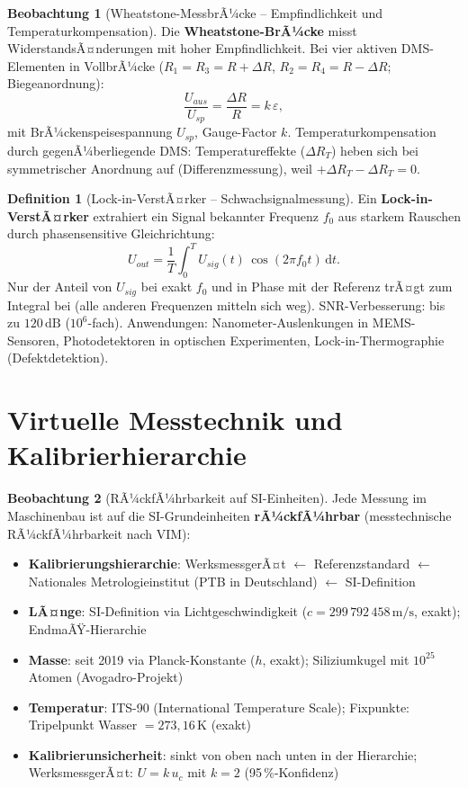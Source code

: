 ﻿\documentclass[a4paper,12pt]{report}
\theoremstyle{definition}
\newtheorem{definition}{Definition}
\newtheorem{beobachtung}{Beobachtung}
\begin{document}
\begin{beobachtung}[Wheatstone-MessbrÃ¼cke -- Empfindlichkeit und Temperaturkompensation]
Die \textbf{Wheatstone-BrÃ¼cke} misst WiderstandsÃ¤nderungen mit hoher Empfindlichkeit.
Bei vier aktiven DMS-Elementen in VollbrÃ¼cke ($R_1 = R_3 = R+\Delta R$,
$R_2 = R_4 = R-\Delta R$; Biegeanordnung):
\[
  \frac{U_{aus}}{U_{sp}} = \frac{\Delta R}{R} = k\,\varepsilon,
\]
mit BrÃ¼ckenspeisespannung $U_{sp}$, Gauge-Factor $k$.
Temperaturkompensation durch gegenÃ¼berliegende DMS:
Temperatureffekte ($\Delta R_{T}$) heben sich bei symmetrischer Anordnung auf
(Differenzmessung), weil $+\Delta R_T - \Delta R_T = 0$.
\end{beobachtung}

\begin{definition}[Lock-in-VerstÃ¤rker -- Schwachsignalmessung]
Ein \textbf{Lock-in-VerstÃ¤rker} extrahiert ein Signal bekannter Frequenz $f_0$
aus starkem Rauschen durch phasensensitive Gleichrichtung:
\[
  U_{out} = \frac{1}{T}\int_0^T U_{sig}(t)\,\cos(2\pi f_0 t)\,\mathrm{d}t.
\]
Nur der Anteil von $U_{sig}$ bei exakt $f_0$ und in Phase mit der Referenz
trÃ¤gt zum Integral bei (alle anderen Frequenzen mitteln sich weg).
SNR-Verbesserung: bis zu $120\,\mathrm{dB}$ ($10^6$-fach).
Anwendungen: Nanometer-Auslenkungen in MEMS-Sensoren, Photodetektoren
in optischen Experimenten, Lock-in-Thermographie (Defektdetektion).
\end{definition}

\section{Virtuelle Messtechnik und Kalibrierhierarchie}

\begin{beobachtung}[RÃ¼ckfÃ¼hrbarkeit auf SI-Einheiten]
Jede Messung im Maschinenbau ist auf die SI-Grundeinheiten
\textbf{rÃ¼ckfÃ¼hrbar} (messtechnische RÃ¼ckfÃ¼hrbarkeit nach VIM):
\begin{itemize}
    \item[-] \textbf{Kalibrierungshierarchie}: WerksmessgerÃ¤t $\leftarrow$
          Referenzstandard $\leftarrow$ Nationales Metrologieinstitut
          (PTB in Deutschland) $\leftarrow$ SI-Definition
    \item[-] \textbf{LÃ¤nge}: SI-Definition via Lichtgeschwindigkeit
          ($c = 299\,792\,458\,\mathrm{m/s}$, exakt); EndmaÃŸ-Hierarchie
    \item[-] \textbf{Masse}: seit 2019 via Planck-Konstante ($h$, exakt);
          Siliziumkugel mit $10^{25}$ Atomen (Avogadro-Projekt)
    \item[-] \textbf{Temperatur}: ITS-90 (International Temperature Scale);
          Fixpunkte: Tripelpunkt Wasser $= 273{,}16\,\mathrm{K}$ (exakt)
    \item[-] \textbf{Kalibrierunsicherheit}: sinkt von oben nach unten
          in der Hierarchie; WerksmessgerÃ¤t: $U = k\,u_c$ mit $k=2$
          (95\,\%-Konfidenz)
\end{itemize}
\end{beobachtung}
\end{document}
